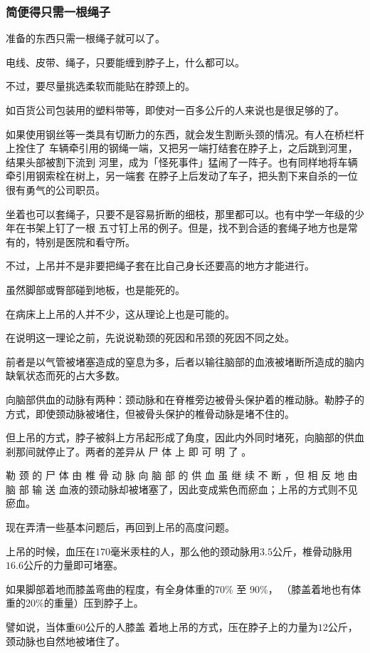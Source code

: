 \documentclass[UTF8]{ctexart}
\begin{document}
\subsubsection*{简便得只需一根绳子}

准备的东西只需一根绳子就可以了。

电线、皮带、绳子，只要能缠到脖子上，什么都可以。

不过，要尽量挑选柔软而能贴在脖颈上的。

如百货公司包装用的塑料带等，即使对一百多公斤的人来说也是很足够的了。

如果使用钢丝等一类具有切断力的东西，就会发生割断头颈的情况。有人在桥栏杆上拴住了
车辆牵引用的钢绳一端，又把另一端打结套在脖子上，之后跳到河里，结果头部被割下流到
河里，成为「怪死事件」猛闹了一阵子。也有同样地将车辆牵引用钢索栓在树上，另一端套
在脖子上后发动了车子，把头割下来自杀的一位很有勇气的公司职员。

坐着也可以套绳子，只要不是容易折断的细枝，那里都可以。也有中学一年级的少年在书架上钉了一根
五寸钉上吊的例子。但是，找不到合适的套绳子地方也是常有的，特别是医院和看守所。

不过，上吊并不是非要把绳子套在比自己身长还要高的地方才能进行。

虽然脚部或臀部碰到地板，也是能死的。

在病床上上吊的人并不少，这从理论上也是可能的。

在说明这一理论之前，先说说勒颈的死因和吊颈的死因不同之处。

前者是以气管被堵塞造成的窒息为多，后者以输往脑部的血液被堵断所造成的脑内缺氧状态而死的占大多数。

向脑部供血的动脉有两种：颈动脉和在脊椎旁边被骨头保护着的椎动脉。勒脖子的方式，即使颈动脉被堵住，但被骨头保护的椎骨动脉是堵不住的。

但上吊的方式，脖子被斜上方吊起形成了角度，因此内外同时堵死，向脑部的供血剎那间就停止了。两者的差异从 尸 体 上 即 可 明 了 。

勒 颈 的 尸 体 由 椎 骨 动 脉 向 脑 部 的 供 血 虽 继 续 不 断 ，但 相 反 地 由 脑 部 输 送 血液的颈动脉却被堵塞了，因此变成紫色而瘀血；上吊的方式则不见瘀血。

现在弄清一些基本问题后，再回到上吊的高度问题。

上吊的时候，血压在$170$毫米汞柱的人，那么他的颈动脉用$3.5$公斤，椎骨动脉用$16.6$公斤的力量即可堵塞。

如果脚部着地而膝盖弯曲的程度，有全身体重的$70\%$ 至 $90\%$， （膝盖着地也有体重的$20\%$的重量）压到脖子上。

譬如说，当体重$60$公斤的人膝盖 着地上吊的方式，压在脖子上的力量为$12$公斤，颈动脉也自然地被堵住了。
\end{document}
